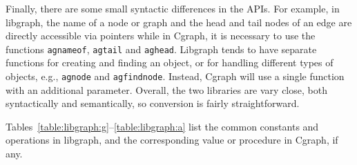 \documentclass[11pt,letterpaper]{article}
\begin{document}
Finally, there are some small syntactic differences in the APIs.
For example, in libgraph, the name of a node or graph and
the head and tail nodes of an edge are
directly accessible via pointers while in Cgraph, it is necessary to use
the functions \verb"agnameof", \verb"agtail" and \verb"aghead".
Libgraph tends to have separate functions for creating and finding
an object, or for handling different types of objects, e.g., 
\verb"agnode" and \verb"agfindnode". Instead, Cgraph will use a single function
with an additional parameter. Overall, the two libraries are vary close, both
syntactically and semantically, so conversion is fairly straightforward.

Tables~\ref{table:libgraph:g}--\ref{table:libgraph:a} list the common 
constants and operations in
libgraph, and the corresponding value or procedure in Cgraph, if any.
\end{document}
